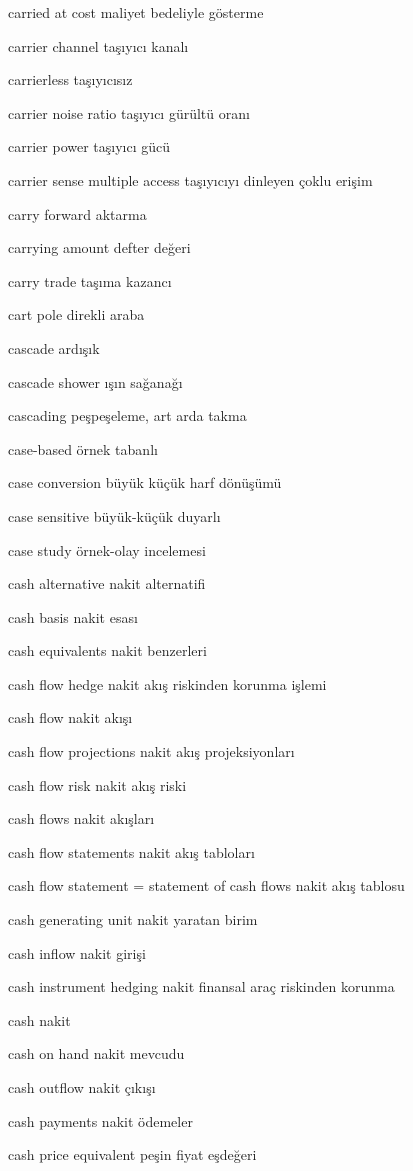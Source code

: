 \documentclass[12pt,fleqn]{article}\usepackage{../../common}
\begin{document}
carried at cost maliyet bedeliyle gösterme

carrier channel taşıyıcı kanalı

carrierless taşıyıcısız

carrier noise ratio taşıyıcı gürültü oranı

carrier power taşıyıcı gücü

carrier sense multiple access taşıyıcıyı dinleyen çoklu erişim

carry forward aktarma

carrying amount defter değeri

carry trade taşıma kazancı

cart pole direkli araba

cascade ardışık

cascade shower ışın sağanağı

cascading peşpeşeleme, art arda takma

case-based örnek tabanlı

case conversion büyük küçük harf dönüşümü

case sensitive büyük-küçük duyarlı

case study örnek-olay incelemesi

cash alternative nakit alternatifi

cash basis nakit esası

cash equivalents nakit benzerleri

cash flow hedge nakit akış riskinden korunma işlemi

cash flow nakit akışı

cash flow projections nakit akış projeksiyonları

cash flow risk nakit akış riski

cash flows nakit akışları

cash flow statements nakit akış tabloları

cash flow statement = statement of cash flows nakit akış tablosu

cash generating unit nakit yaratan birim

cash inflow nakit girişi

cash instrument hedging nakit finansal araç riskinden korunma

cash nakit

cash on hand nakit mevcudu

cash outflow nakit çıkışı

cash payments nakit ödemeler

cash price equivalent peşin fiyat eşdeğeri
\end{document}
